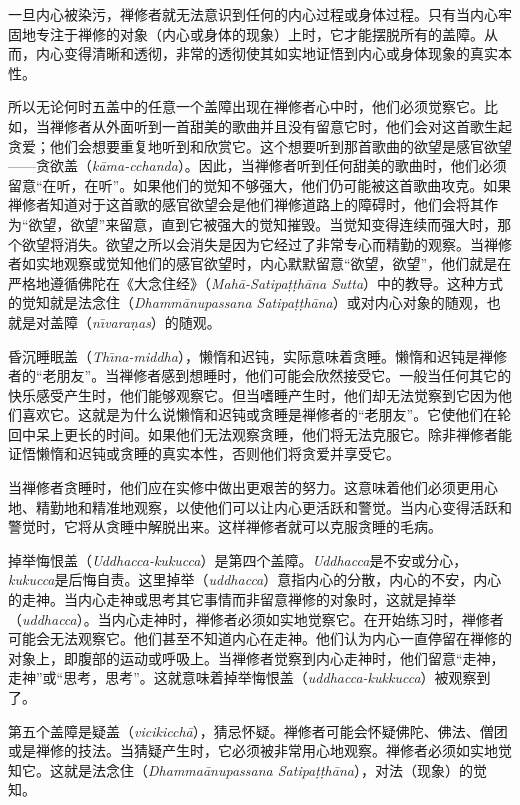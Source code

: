 一旦内心被染污，禅修者就无法意识到任何的内心过程或身体过程。只有当内心牢固地专注于禅修的对象（内心或身体的现象）上时，它才能摆脱所有的盖障。从而，内心变得清晰和透彻，非常的透彻使其如实地证悟到内心或身体现象的真实本性。

所以无论何时五盖中的任意一个盖障出现在禅修者心中时，他们必须觉察它。比如，当禅修者从外面听到一首甜美的歌曲并且没有留意它时，他们会对这首歌生起贪爱；他们会想要重复地听到和欣赏它。这个想要听到那首歌曲的欲望是感官欲望——贪欲盖（{\it k\=ama-\1cchanda}）。因此，当禅修者听到任何甜美的歌曲时，他们必须留意“在听，在听”。如果他们的觉知不够强大，他们仍可能被这首歌曲攻克。如果禅修者知道对于这首歌的感官欲望会是他们禅修道路上的障碍时，他们会将其作为“欲望，欲望”来留意，直到它被强大的觉知摧毁。当觉知变得连续而强大时，那个欲望将消失。欲望之所以会消失是因为它经过了非常专心而精勤的观察。当禅修者如实地观察或觉知他们的感官欲望时，内心默默留意“欲望，欲望”，他们就是在严格地遵循佛陀在《大念住经》（{\it Mah\=a-Satipa\d t\d th\=ana Sutta}）中的教导。这种方式的觉知就是法念住（{\it Dhamm\=anupassana Satipa\d t\d th\=ana}）或对内心对象的随观，也就是对盖障（{\it n\=\i vara\d nas}）的随观。

昏沉睡眠盖（{\it Th\=\i na-middha}），懒惰和迟钝，实际意味着贪睡。懒惰和迟钝是禅修者的“老朋友”。当禅修者感到想睡时，他们可能会欣然接受它。一般当任何其它的快乐感受产生时，他们能够观察它。但当嗜睡产生时，他们却无法觉察到它因为他们喜欢它。这就是为什么说懒惰和迟钝或贪睡是禅修者的“老朋友”。它使他们在轮回中呆上更长的时间。如果他们无法观察贪睡，他们将无法克服它。除非禅修者能证悟懒惰和迟钝或贪睡的真实本性，否则他们将贪爱并享受它。

当禅修者贪睡时，他们应在实修中做出更艰苦的努力。这意味着他们必须更用心地、精勤地和精准地观察，以使他们可以让内心更活跃和警觉。\1当内心变得活跃和警觉时，它将从贪睡中解脱出来。这样禅修者就可以克服贪睡的毛病。

掉举悔恨盖（{\it Uddhacca-kukucca}）是第四个盖障。{\it Uddhacca}是不安或分心，{\it kukucca}是后悔自责。这里掉举（{\it uddhacca}）意指内心的分散，内心的不安，内心的走神。当内心走神或思考其它事情而非留意禅修的对象时，这就是掉举（{\it uddhacca}）。当内心走神时，禅修者必须如实地觉察它。在开始练习时，禅修者可能会无法观察它。他们甚至不知道内心在走神。他们认为内心一直停留在禅修的对象上，即腹部的运动或呼吸上。当禅修者觉察到内心走神时，他们留意“走神，走神”或“思考，思考”。这就意味着掉举悔恨盖（{\it uddhacca-kukkucca}）被观察到了。

第五个盖障是疑盖（{\it vicikicch\=a}），猜忌怀疑。禅修者可能会怀疑佛陀、佛法、僧团或是禅修的技法。当猜疑产生时，它必须被非常用心地观察。禅修者必须如实地觉知它。这就是法念住（{\it Dhamma\=anupassana Satipa\d t\d th\=ana}），对法（现象）的觉知。

